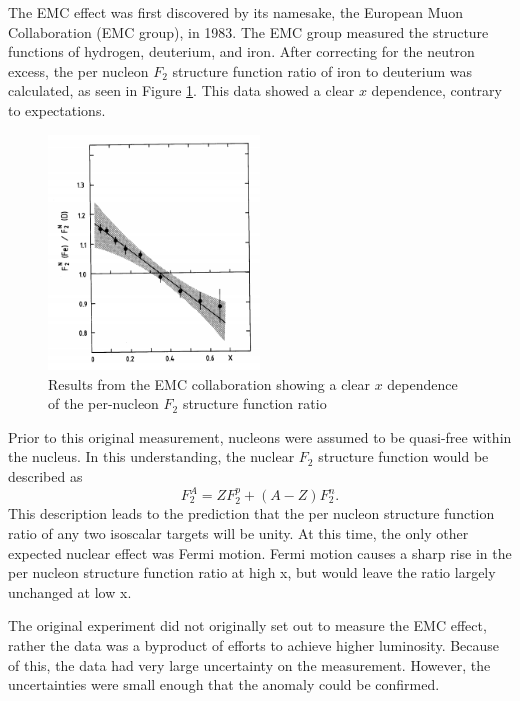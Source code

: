 The EMC effect was first discovered by its namesake, the European Muon Collaboration (EMC group), in 1983. The EMC group measured the structure functions of hydrogen, deuterium, and iron. After correcting for the neutron excess, the per nucleon $F_2$ structure function ratio of iron to deuterium was calculated, as seen in Figure \ref{emc_fe}. This data showed a clear $x$ dependence, contrary to expectations.

\begin{figure}
\begin{center}
	\includegraphics[width=0.5\textwidth]{./EMC/fig/original_EMC.png}
	\caption{Results from the EMC collaboration showing a clear $x$ dependence of the per-nucleon $F_2$ structure function ratio \cite{emc_FE}}
	\label{emc_fe}
\end{center}
\end{figure}

Prior to this original measurement, nucleons were assumed to be quasi-free within the nucleus. In this understanding, the nuclear $F_2$ structure function would be described as
\begin{equation}
	F_2^A = ZF_2^p + \left(A-Z\right)F_2^n.
\end{equation}
This description leads to the prediction that the per nucleon structure function ratio of any two isoscalar targets will be unity. At this time, the only other expected nuclear effect was Fermi motion. Fermi motion causes a sharp rise in the per nucleon structure function ratio at high x, but would leave the ratio largely unchanged at low x.

The original experiment did not originally set out to measure the EMC effect, rather the data was a byproduct of efforts to achieve higher luminosity. Because of this, the data had very large uncertainty on the measurement. However, the uncertainties were small enough that the anomaly could be confirmed.

